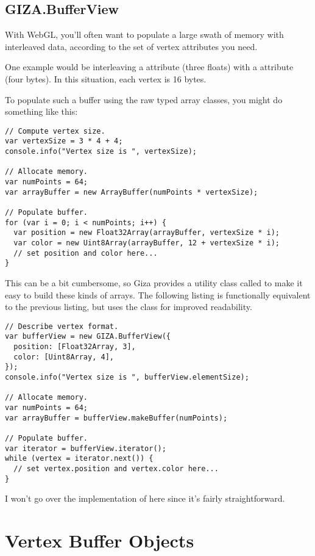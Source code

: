 \subsection{GIZA.BufferView}

With WebGL, you'll often want to populate a large swath of memory with interleaved data, according to the set of vertex attributes you need.

One example would be interleaving a  attribute (three floats) with a  attribute (four bytes).  In this situation, each vertex is 16 bytes.

To populate such a buffer using the raw typed array classes, you might do something like this:

\begin{lstlisting}
// Compute vertex size.
var vertexSize = 3 * 4 + 4;
console.info("Vertex size is ", vertexSize);

// Allocate memory.
var numPoints = 64;
var arrayBuffer = new ArrayBuffer(numPoints * vertexSize);

// Populate buffer.
for (var i = 0; i < numPoints; i++) {
  var position = new Float32Array(arrayBuffer, vertexSize * i);
  var color = new Uint8Array(arrayBuffer, 12 + vertexSize * i);
  // set position and color here...
}
\end{lstlisting}

This can be a bit cumbersome, so Giza provides a utility class called  to make it easy to build these kinds of arrays.  The following listing is functionally equivalent to the previous listing, but uses the  class for improved readability.

\begin{lstlisting}
// Describe vertex format.
var bufferView = new GIZA.BufferView({
  position: [Float32Array, 3],
  color: [Uint8Array, 4],
});
console.info("Vertex size is ", bufferView.elementSize);

// Allocate memory.
var numPoints = 64;
var arrayBuffer = bufferView.makeBuffer(numPoints);

// Populate buffer.
var iterator = bufferView.iterator();
while (vertex = iterator.next()) {
  // set vertex.position and vertex.color here...
}
\end{lstlisting}

I won't go over the implementation of  here since it's fairly straightforward.

\section{Vertex Buffer Objects}

